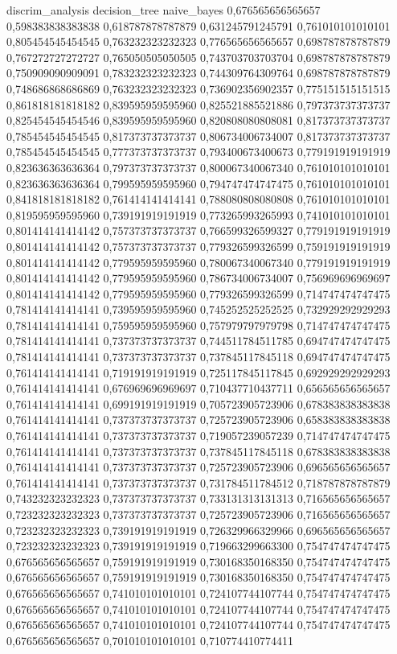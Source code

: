 
discrim_analysis	decision_tree	naive_bayes
0,676565656565657	0,598383838383838	0,618787878787879	0,631245791245791
0,761010101010101	0,805454545454545	0,763232323232323	0,776565656565657
0,698787878787879	0,767272727272727	0,765050505050505	0,743703703703704
0,698787878787879	0,750909090909091	0,783232323232323	0,744309764309764
0,698787878787879	0,748686868686869	0,763232323232323	0,736902356902357
0,775151515151515	0,861818181818182	0,839595959595960	0,825521885521886
0,797373737373737	0,825454545454546	0,839595959595960	0,820808080808081
0,817373737373737	0,785454545454545	0,817373737373737	0,806734006734007
0,817373737373737	0,785454545454545	0,777373737373737	0,793400673400673
0,779191919191919	0,823636363636364	0,797373737373737	0,800067340067340
0,761010101010101	0,823636363636364	0,799595959595960	0,794747474747475
0,761010101010101	0,841818181818182	0,761414141414141	0,788080808080808
0,761010101010101	0,819595959595960	0,739191919191919	0,773265993265993
0,741010101010101	0,801414141414142	0,757373737373737	0,766599326599327
0,779191919191919	0,801414141414142	0,757373737373737	0,779326599326599
0,759191919191919	0,801414141414142	0,779595959595960	0,780067340067340
0,779191919191919	0,801414141414142	0,779595959595960	0,786734006734007
0,756969696969697	0,801414141414142	0,779595959595960	0,779326599326599
0,714747474747475	0,781414141414141	0,739595959595960	0,745252525252525
0,732929292929293	0,781414141414141	0,759595959595960	0,757979797979798
0,714747474747475	0,781414141414141	0,737373737373737	0,744511784511785
0,694747474747475	0,781414141414141	0,737373737373737	0,737845117845118
0,694747474747475	0,761414141414141	0,719191919191919	0,725117845117845
0,692929292929293	0,761414141414141	0,676969696969697	0,710437710437711
0,656565656565657	0,761414141414141	0,699191919191919	0,705723905723906
0,678383838383838	0,761414141414141	0,737373737373737	0,725723905723906
0,658383838383838	0,761414141414141	0,737373737373737	0,719057239057239
0,714747474747475	0,761414141414141	0,737373737373737	0,737845117845118
0,678383838383838	0,761414141414141	0,737373737373737	0,725723905723906
0,696565656565657	0,761414141414141	0,737373737373737	0,731784511784512
0,718787878787879	0,743232323232323	0,737373737373737	0,733131313131313
0,716565656565657	0,723232323232323	0,737373737373737	0,725723905723906
0,716565656565657	0,723232323232323	0,739191919191919	0,726329966329966
0,696565656565657	0,723232323232323	0,739191919191919	0,719663299663300
0,754747474747475	0,676565656565657	0,759191919191919	0,730168350168350
0,754747474747475	0,676565656565657	0,759191919191919	0,730168350168350
0,754747474747475	0,676565656565657	0,741010101010101	0,724107744107744
0,754747474747475	0,676565656565657	0,741010101010101	0,724107744107744
0,754747474747475	0,676565656565657	0,741010101010101	0,724107744107744
0,754747474747475	0,676565656565657	0,701010101010101	0,710774410774411